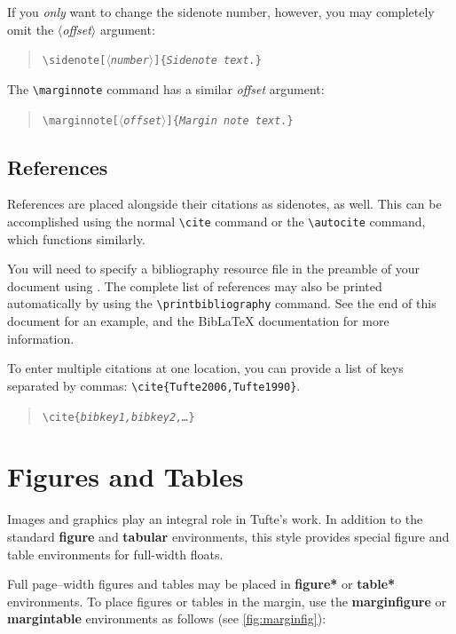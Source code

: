 \documentclass[a4paper]{tufte-handout}
\newcommand{\doccmd}[1]{\texttt{\textbackslash#1}}
\newcommand{\docopt}[1]{\ensuremath{\langle}\textrm{\textit{#1}}\ensuremath{\rangle}}
\newcommand{\docarg}[1]{\textrm{\textit{#1}}}
\newcommand{\docenv}[1]{\textrm{\textbf{#1}}}
\newenvironment{docspec}{\begin{quote}\noindent}{\end{quote}}
\begin{document}
If you \emph{only} want to change the sidenote number, however, you may
completely omit the \docopt{offset} argument:
\begin{docspec}
  \doccmd{sidenote[\docopt{number}]\{\docarg{Sidenote text.}\}}
\end{docspec}

The \Verb|\marginnote| command has a similar \docarg{offset} argument:
\begin{docspec}
  \doccmd{marginnote[\docopt{offset}]\{\docarg{Margin note text.}\}}
\end{docspec}

\subsection{References}
References are placed alongside their citations as sidenotes,
as well. This can be accomplished using the normal \Verb|\cite|
command or the \Verb|\autocite| command, which functions
similarly.

You will need to specify a bibliography resource file in the preamble of your
document using \Verb||. The complete list of references may
also be printed automatically by using the \Verb|\printbibliography| command.
See the end of this document for an example, and the Bib\LaTeX{} documentation
for more information.

To enter multiple citations at one location,\autocite{Tufte2006,Tufte1990} you can
provide a list of keys separated by commas: \Verb|\cite{Tufte2006,Tufte1990}|. 
\begin{docspec}
  \doccmd{cite\{\docarg{bibkey1,bibkey2,\ldots}\}}
\end{docspec}

\section{Figures and Tables}\label{sec:figures-and-tables}
Images and graphics play an integral role in Tufte's work.
In addition to the standard \docenv{figure} and \docenv{tabular} environments,
this style provides special figure and table environments for full-width
floats.

Full page--width figures and tables may be placed in \docenv{figure*} or
\docenv{table*} environments. To place figures or tables in the margin,
use the \docenv{marginfigure} or \docenv{margintable} environments as follows
(see \cref{fig:marginfig}):
\end{document}

